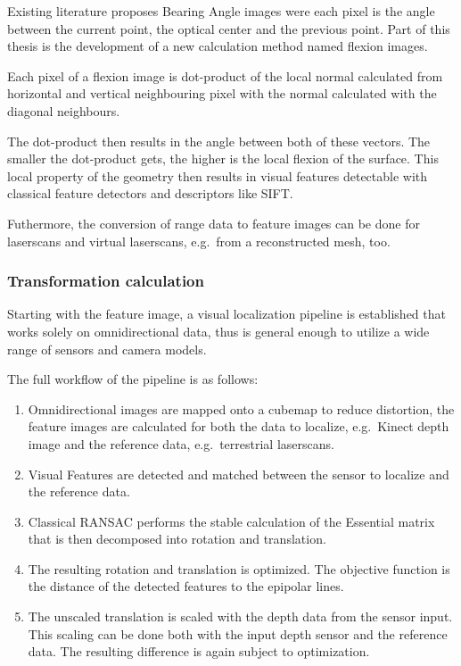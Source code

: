 \documentclass[doktyp=marbeit,fontsize=11pt]{TUBAFarbeiten}
\begin{document}
Existing literature proposes Bearing Angle images were each pixel is the
angle between the current point, the optical center and the previous
point. Part of this thesis is the development of a new calculation
method named flexion images.

Each pixel of a flexion image is dot-product of the local normal
calculated from horizontal and vertical neighbouring pixel with the
normal calculated with the diagonal neighbours.

The dot-product then results in the angle between both of these vectors.
The smaller the dot-product gets, the higher is the local flexion of the
surface. This local property of the geometry then results in visual
features detectable with classical feature detectors and descriptors like
SIFT.

Futhermore, the conversion of range data to feature images can be done
for laserscans and virtual laserscans, e.g.~from a reconstructed mesh,
too.

\subsubsection{Transformation calculation}\label{transformation-calculation}

Starting with the feature image, a visual localization pipeline is
established that works solely on omnidirectional data, thus is general
enough to utilize a wide range of sensors and camera models.

The full workflow of the pipeline is as follows:

\begin{enumerate}
\item Omnidirectional images are mapped onto a cubemap to reduce distortion,
  the feature images are calculated for both the data to localize,
  e.g.~Kinect depth image and the reference data, e.g.~terrestrial
  laserscans.
\item Visual Features are detected and matched between the sensor to
  localize and the reference data.
\item Classical RANSAC performs the stable calculation of the
  Essential matrix that is then decomposed into rotation and translation.
\item The resulting rotation and translation is optimized. The objective
  function is the distance of the detected features to the epipolar
  lines.
\item The unscaled translation is scaled with the depth data from the sensor
  input. This scaling can be done both with the input depth sensor and
  the reference data. The resulting difference is again subject to
  optimization.
\end{enumerate}
\end{document}
